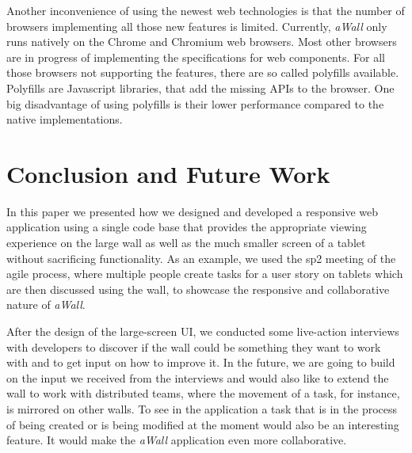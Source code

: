 \documentclass{sigchi}
\begin{document}
Another inconvenience of using the newest web technologies is that the number of browsers implementing all those new features is limited.
Currently, \textit{aWall} only runs natively on the Chrome and Chromium web browsers.
Most other browsers are in progress of implementing the specifications for web components.
For all those browsers not supporting the features, there are so called polyfills available.
Polyfills are Javascript libraries, that add the missing APIs to the browser.
One big disadvantage of using polyfills is their lower performance compared to the native implementations.


\section{Conclusion and Future Work}
In this paper we presented how we designed and developed a responsive web application using a single code base that provides the appropriate viewing experience on the large wall as well as the much smaller screen of a tablet without sacrificing functionality.
As an example, we used the \gls{sp2} meeting of the agile process, where multiple people create tasks for a user story on tablets which are then discussed using the wall, to showcase the responsive and collaborative nature of \textit{aWall}.

After the design of the large-screen UI, we conducted some live-action interviews with developers to discover if the wall could be something they want to work with and to get input on how to improve it.
In the future, we are going to build on the input we received from the interviews and would also like to extend the wall to work with distributed teams, where the movement of a task, for instance, is mirrored on other walls.
To see in the application a task that is in the process of being created or is being modified at the moment would also be an interesting feature.
It would make the \textit{aWall} application even more collaborative.


\balance{}



\end{document}
